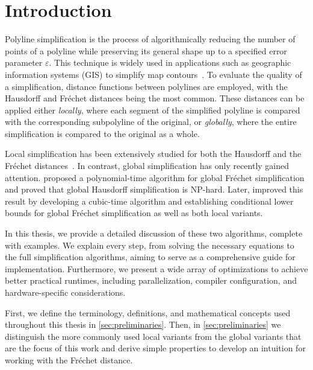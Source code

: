 \section{Introduction}
\label{sec:introduction}

Polyline simplification is the process of algorithmically reducing the number of points of a polyline while preserving its general shape up to a specified error parameter \(\varepsilon\). This technique is widely used in applications such as geographic information systems (GIS) to simplify map contours~\cite{algorithms_reduction_number_points_caricature}. To evaluate the quality of a simplification, distance functions between polylines are employed, with the Hausdorff and Fréchet distances being the most common. These distances can be applied either \emph{locally}, where each segment of the simplified polyline is compared with the corresponding subpolyline of the original, or \emph{globally}, where the entire simplification is compared to the original as a whole.

Local simplification has been extensively studied for both the Hausdorff and the Fréchet distances~\cite{polyline_simplification_under_the_local_frechet_distance_has_almost_quadratic_runtime_in_2d_storandtetal,computational_geometric_methods_for_polygonal_approximations_of_a_curve}. In contrast, global simplification has only recently gained attention. \citeauthor{on_optimal_polyline_simplification_using_the_hausdorff_and_frechet_distance} proposed a polynomial-time algorithm for global Fréchet simplification and proved that global Hausdorff simplification is NP-hard. Later, \citeauthor{polyline_simplification_has_cubic_complexity_bringmannetal} improved this result by developing a cubic-time algorithm and establishing conditional lower bounds for global Fréchet simplification as well as both local variants.

In this thesis, we provide a detailed discussion of these two algorithms, complete with examples. We explain every step, from solving the necessary equations to the full simplification algorithms, aiming to serve as a comprehensive guide for implementation. Furthermore, we present a wide array of optimizations to achieve better practical runtimes, including parallelization, compiler configuration, and hardware-specific considerations.

First, we define the terminology, definitions, and mathematical concepts used throughout this thesis in \cref{sec:preliminaries}. Then, in \cref{sec:preliminaries} we distinguish the more commonly used local variants from the global variants that are the focus of this work and derive simple properties to develop an intuition for working with the Fréchet distance.

